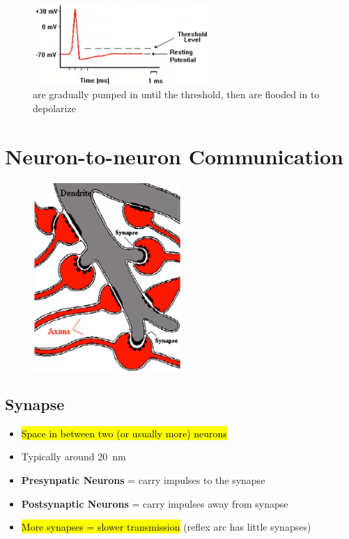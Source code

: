 \documentclass[a4paper,12pt]{article}
\begin{document}
\begin{figure}[H]
    \centering
    \includegraphics[width=0.6\textwidth]{threshold2}
    \caption{ are gradually pumped in until the threshold, then  are flooded in to depolarize}
\end{figure}

\section{Neuron-to-neuron Communication}
\begin{figure}[H]
    \centering
    \includegraphics[width=0.5\textwidth]{synapse}
\end{figure}
\subsection{Synapse}
\begin{itemize}
    \item{\hl{Space in between two (or usually more) neurons}}
    \item{Typically around \SI{20}{\nm}}
    \item{\textbf{Presynpatic Neurons} = carry impulses to the synapse}
    \item{\textbf{Postsynaptic Neurons} = carry impulses away from synapse}
    \item{\hl{More synapses = slower transmission} (reflex arc has little synapses)}
\end{itemize}
\end{document}
